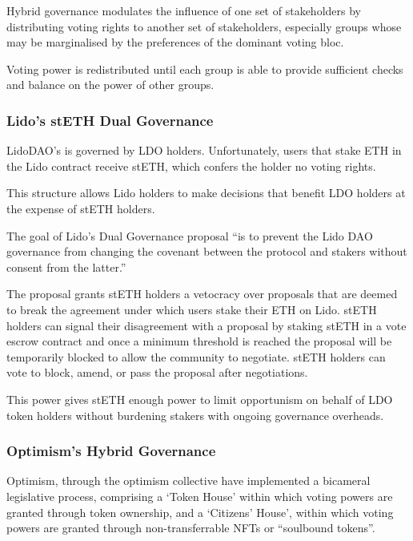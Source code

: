 \documentclass[
]{article}
\begin{document}
Hybrid governance modulates the influence of one set of stakeholders by
distributing voting rights to another set of stakeholders, especially
groups whose may be marginalised by the preferences of the dominant
voting bloc.

Voting power is redistributed until each group is able to provide
sufficient checks and balance on the power of other groups.

\hypertarget{lidos-steth-dual-governance}{%
\subsubsection{Lido's stETH Dual
Governance}\label{lidos-steth-dual-governance}}

LidoDAO's is governed by LDO holders. Unfortunately, users that stake
ETH in the Lido contract receive stETH, which confers the holder no
voting rights.

This structure allows Lido holders to make decisions that benefit LDO
holders at the expense of stETH holders.

The goal of Lido's Dual Governance proposal ``is to prevent the Lido DAO
governance from changing the covenant between the protocol and stakers
without consent from the latter.''

The proposal grants stETH holders a vetocracy over proposals that are
deemed to break the agreement under which users stake their ETH on Lido.
stETH holders can signal their disagreement with a proposal by staking
stETH in a vote escrow contract and once a minimum threshold is reached
the proposal will be temporarily blocked to allow the community to
negotiate. stETH holders can vote to block, amend, or pass the proposal
after negotiations.

This power gives stETH enough power to limit opportunism on behalf of
LDO token holders without burdening stakers with ongoing governance
overheads.

\hypertarget{optimisms-hybrid-governance}{%
\subsubsection{Optimism's Hybrid
Governance}\label{optimisms-hybrid-governance}}

Optimism, through the optimism collective have implemented a bicameral
legislative process, comprising a `Token House' within which voting
powers are granted through token ownership, and a `Citizens' House',
within which voting powers are granted through non-transferrable NFTs or
``soulbound tokens''.
\end{document}
